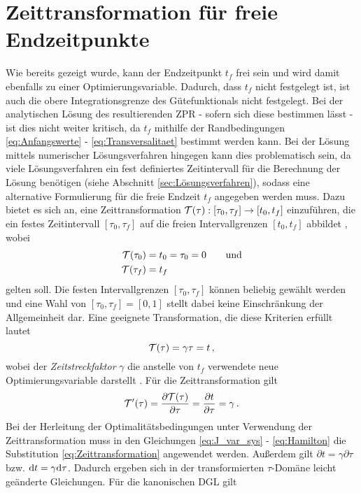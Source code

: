\section{Zeittransformation für freie Endzeitpunkte}\label{sec:Zeittransformation}
Wie bereits gezeigt wurde, kann der Endzeitpunkt $t_f$ frei sein und wird damit ebenfalls zu einer Optimierungsvariable. Dadurch, dass $t_f$ nicht festgelegt ist, ist auch die obere Integrationsgrenze des Gütefunktionals nicht festgelegt. Bei der analytischen Lösung des resultierenden \gls{ZPR} - sofern sich diese bestimmen lässt - ist dies nicht weiter kritisch, da $t_f$ mithilfe der Randbedingungen \eqref{eq:Anfangswerte} - \eqref{eq:Transversalitaet} bestimmt werden kann. Bei der Lösung mittels numerischer Lösungsverfahren hingegen kann dies problematisch sein, da viele Lösungsverfahren ein fest definiertes Zeitintervall für die Berechnung der Lösung benötigen (siehe Abschnitt \ref{sec:Lösungsverfahren}), sodass eine alternative Formulierung für die freie Endzeit $t_f$ angegeben werden muss. Dazu bietet es sich an, eine Zeittransformation $\mathcal{T}(\tau): [\tau_0, \tau_f] \rightarrow [t_0, t_f]$ einzuführen, die ein festes Zeitintervall $[\tau_0, \tau_f]$ auf die freien Intervallgrenzen $[t_0, t_f]$ abbildet \cite{Gerdts.2010}, wobei 
\begin{align}
	\mathcal{T}(\tau_0) &= t_0 = \tau_0 = 0 \qquad \textrm{und} \\
	\mathcal{T}(\tau_f) &= t_f
\end{align}
gelten soll. Die festen Intervallgrenzen $[\tau_0, \tau_f]$ können beliebig gewählt werden und eine Wahl von $[\tau_0, \tau_f] = [0, 1]$ stellt dabei keine Einschränkung der Allgemeinheit dar. Eine geeignete Transformation, die diese Kriterien erfüllt lautet
\begin{equation}
	\mathcal{T}(\tau) = \gamma\tau = t\,, \label{eq:Zeittransformation}
\end{equation}
wobei der \textit{Zeitstreckfaktor} $\gamma$ die anstelle von $t_f$ verwendete neue Optimierungsvariable darstellt \cite{KnutGraichen.2012}. Für die Zeittransformation gilt 
\begin{equation}
	\mathcal{T}'(\tau) = \frac{\partial\mathcal{T}(\tau)}{\partial\tau} = \frac{\partial t}{\partial\tau} = \gamma\,.
\end{equation}
Bei der Herleitung der Optimalitätsbedingungen unter Verwendung der Zeittransformation muss in den Gleichungen \eqref{eq:J_var_sys} - \eqref{eq:Hamilton} die Substitution \eqref{eq:Zeittransformation} angewendet werden. Außerdem gilt $\partial t = \gamma\partial\tau$ bzw. $\textrm{d}{t} = \gamma\textrm{d}{\tau}$. Dadurch ergeben sich in der transformierten $\tau$-Domäne leicht geänderte Gleichungen. Für die kanonischen \gls{DGL} gilt 
